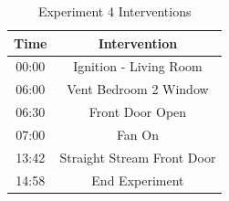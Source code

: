 \documentclass{article}
\begin{document}
\begin{table}[H]
	\centering
	\caption{Experiment 4 Interventions}
	\begin{tabular}{|c|c|} 
		\hline
		Time & Intervention \\ \hline \hline
		00:00 & Ignition - Living Room \\ \hline
		06:00 & Vent Bedroom 2 Window \\ \hline
		06:30 & Front Door Open \\ \hline
		07:00 & Fan On \\ \hline
		13:42 & Straight Stream Front Door \\ \hline
		14:58 & End Experiment \\ \hline
	\end{tabular}
	\label{Table:Exp4Interventions}
\end{table}
\end{document}
